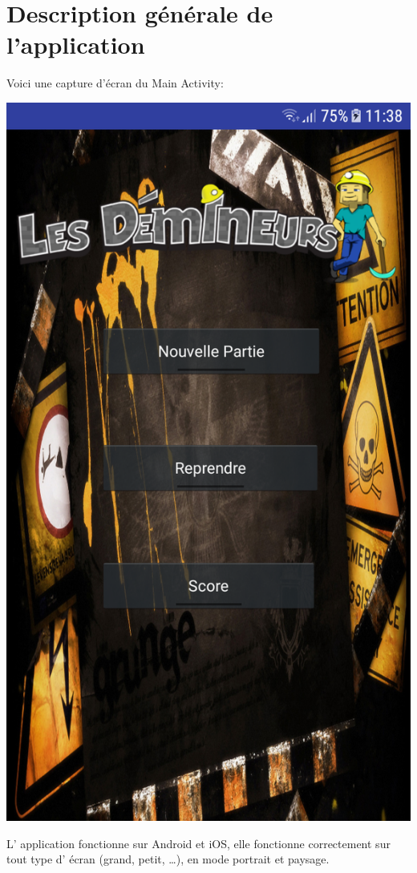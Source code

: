 \documentclass{article}
\begin{document}
\section{Description générale de l'application}
Voici une capture d'écran du Main Activity:
\begin{center}
  \includegraphics[scale=0.12]{Main.png}
\end{center}
	L' application fonctionne sur Android et iOS, elle fonctionne correctement sur 
tout type d' \'ecran (grand, petit, …), en mode portrait et paysage.\\
\end{document}
